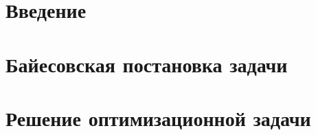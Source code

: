 \documentclass[12pt,a4paper]{article}
\begin{document}
	\newpage \tableofcontents
	\newpage 	
	\newpage \section{Введение} 

	\section{Байесовская постановка задачи} 
	\section{Решение оптимизационной задачи} 
	
	\newpage
\end{document}
